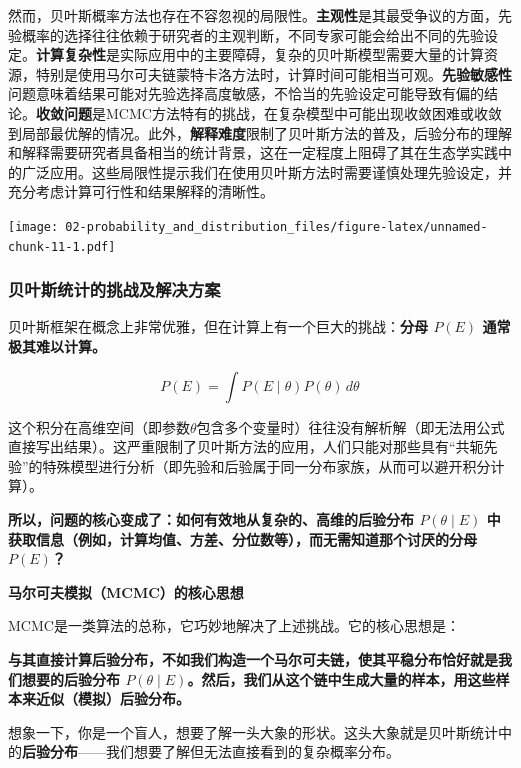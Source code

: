 \documentclass[
  twoside]{book}
\begin{document}
然而，贝叶斯概率方法也存在不容忽视的局限性。\textbf{主观性}是其最受争议的方面，先验概率的选择往往依赖于研究者的主观判断，不同专家可能会给出不同的先验设定。\textbf{计算复杂性}是实际应用中的主要障碍，复杂的贝叶斯模型需要大量的计算资源，特别是使用马尔可夫链蒙特卡洛方法时，计算时间可能相当可观。\textbf{先验敏感性}问题意味着结果可能对先验选择高度敏感，不恰当的先验设定可能导致有偏的结论。\textbf{收敛问题}是MCMC方法特有的挑战，在复杂模型中可能出现收敛困难或收敛到局部最优解的情况。此外，\textbf{解释难度}限制了贝叶斯方法的普及，后验分布的理解和解释需要研究者具备相当的统计背景，这在一定程度上阻碍了其在生态学实践中的广泛应用。这些局限性提示我们在使用贝叶斯方法时需要谨慎处理先验设定，并充分考虑计算可行性和结果解释的清晰性。

\texttt{[image: 02-probability\_and\_distribution\_files/figure-latex/unnamed-chunk-11-1.pdf]}

\hypertarget{ux8d1dux53f6ux65afux7edfux8ba1ux7684ux6311ux6218ux53caux89e3ux51b3ux65b9ux6848}{%
\subsubsection{贝叶斯统计的挑战及解决方案}\label{ux8d1dux53f6ux65afux7edfux8ba1ux7684ux6311ux6218ux53caux89e3ux51b3ux65b9ux6848}}

贝叶斯框架在概念上非常优雅，但在计算上有一个巨大的挑战：\textbf{分母 \(P(E)\) 通常极其难以计算。}

\[ P(E) = \int P(E \mid \theta) P(\theta) \, d\theta \]

这个积分在高维空间（即参数\(\theta\)包含多个变量时）往往没有解析解（即无法用公式直接写出结果）。这严重限制了贝叶斯方法的应用，人们只能对那些具有``共轭先验''的特殊模型进行分析（即先验和后验属于同一分布家族，从而可以避开积分计算）。

\textbf{所以，问题的核心变成了：如何有效地从复杂的、高维的后验分布 \(P(\theta \mid E)\) 中获取信息（例如，计算均值、方差、分位数等），而无需知道那个讨厌的分母 \(P(E)\)？}

\textbf{马尔可夫模拟（MCMC）的核心思想}

MCMC是一类算法的总称，它巧妙地解决了上述挑战。它的核心思想是：

\textbf{与其直接计算后验分布，不如我们构造一个马尔可夫链，使其平稳分布恰好就是我们想要的后验分布 \(P(\theta \mid E)\)。然后，我们从这个链中生成大量的样本，用这些样本来近似（模拟）后验分布。}

想象一下，你是一个盲人，想要了解一头大象的形状。这头大象就是贝叶斯统计中的\textbf{后验分布}------我们想要了解但无法直接看到的复杂概率分布。
\end{document}

